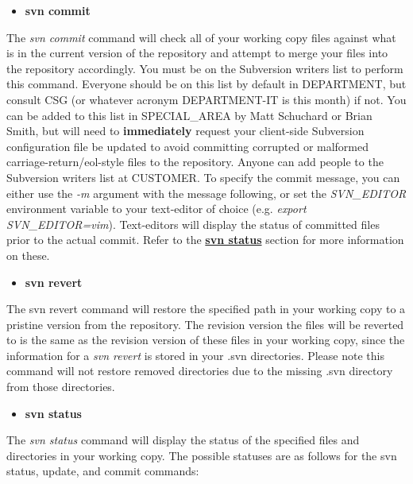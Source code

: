 \documentclass[12pt,letterpaper]{article}
\begin{document}
\begin{itemize}
\item \textbf{svn commit}
\end{itemize}

The \emph{svn commit} command will check all of your working copy files against what is in the current version of the repository and attempt to merge your files into the repository accordingly.  You must be on the Subversion writers list to perform this command.  Everyone should be on this list by default in DEPARTMENT, but consult CSG (or whatever acronym DEPARTMENT-IT is this month) if not.  You can be added to this list in SPECIAL_AREA by Matt Schuchard or Brian Smith, but will need to \textbf{immediately} request your client-side Subversion configuration file be updated to avoid committing corrupted or malformed carriage-return/eol-style files to the repository.  Anyone can add people to the Subversion writers list at CUSTOMER.  To specify the commit message, you can either use the \emph{-m} argument with the message following, or set the \emph{SVN\_EDITOR} environment variable to your text-editor of choice (e.g. \emph{export SVN\_EDITOR=vim}).  Text-editors will display the status of committed files prior to the actual commit.  Refer to the \hyperlink{svnstatus}{\textbf{svn status}} section for more information on these.

\begin{itemize}
\item \textbf{svn revert}
\end{itemize}

The svn revert command will restore the specified path in your working copy to a pristine version from the repository.  The revision version the files will be reverted to is the same as the revision version of these files in your working copy, since the information for a \emph{svn revert} is stored in your .svn directories.  Please note this command will not restore removed directories due to the missing .svn directory from those directories.

\begin{itemize}
\item \textbf{svn status}\hypertarget{svnstatus}{}
\end{itemize}

The \emph{svn status} command will display the status of the specified files and directories in your working copy.  The possible statuses are as follows for the svn status, update, and commit commands:
\end{document}
